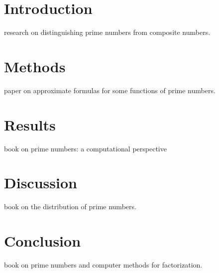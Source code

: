 \documentclass[12pt]{article}
\begin{document}
\section{Introduction}
\cite{Adleman1980} research on distinguishing prime numbers from composite numbers.
\section{Methods}
\cite{BarkleyRosser1962} paper on approximate formulas for some functions of
prime numbers.
\section{Results}
\cite{Crandall2006} book on prime numbers: a computational perspective
\section{Discussion}
\cite{Ingham1932} book on the distribution of prime numbers.
\section{Conclusion}
\cite{Riesel2012} book on prime numbers and computer methods for factorization.

\end{document}
